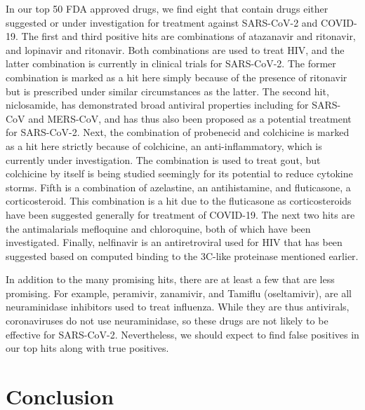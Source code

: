 \documentclass{article}
\begin{document}
In our top 50 FDA approved drugs, we find eight that contain drugs either suggested or under investigation for treatment against SARS-CoV-2 and COVID-19.
The first and third positive hits are combinations of atazanavir and ritonavir, and lopinavir and ritonavir.
Both combinations are used to treat HIV, and the latter combination is currently in clinical trials for SARS-CoV-2\cite{cao2020trial}.
The former combination is marked as a hit here simply because of the presence of ritonavir but is prescribed under similar circumstances as the latter.
The second hit, niclosamide, has demonstrated broad antiviral properties including for SARS-CoV and MERS-CoV, and has thus also been proposed as a potential treatment for SARS-CoV-2\cite{xu2020broad}.
Next, the combination of probenecid and colchicine is marked as a hit here strictly because of colchicine, an anti-inflammatory, which is currently under investigation\cite{colcorona}.
The combination is used to treat gout, but colchicine by itself is being studied seemingly for its potential to reduce cytokine storms.
Fifth is a combination of azelastine, an antihistamine, and fluticasone, a corticosteroid.
This combination is a hit due to the fluticasone as corticosteroids have been suggested generally for treatment of COVID-19\cite{mccreary2020coronavirus}.
The next two hits are the antimalarials mefloquine and chloroquine, both of which have been investigated\cite{Weston2020.03.25.008482,wang2020remdesivir}.
Finally, nelfinavir is an antiretroviral used for HIV that has been suggested based on computed binding to the 3C-like proteinase mentioned earlier.

In addition to the many promising hits, there are at least a few that are less promising.
For example, peramivir, zanamivir, and Tamiflu (oseltamivir), are all neuraminidase inhibitors used to treat influenza.
While they are thus antivirals, coronaviruses do not use neuraminidase, so these drugs are not likely to be effective for SARS-CoV-2\cite{mccreary2020coronavirus}.
Nevertheless, we should expect to find false positives in our top hits along with true positives.

\section{Conclusion}
\end{document}

